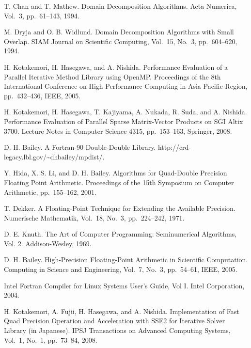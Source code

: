 \documentclass[a4paper]{jarticle}
\begin{document}
{\begin{thebibliography}{10}
T. Chan and T. Mathew.
\newblock Domain Decomposition Algorithms.
\newblock Acta Numerica, Vol.~3, pp.\ 61--143, 1994. 

M. Dryja and O. B. Widlund.
\newblock Domain Decomposition Algorithms with Small Overlap.
\newblock SIAM Journal on Scientific Computing, Vol.~15, No.~3, pp.\ 604--620, 1994.

H. Kotakemori, H. Hasegawa, and A. Nishida.
\newblock Performance Evaluation of a Parallel Iterative Method Library using OpenMP.
\newblock Proceedings of the 8th International Conference on High
	Performance Computing in Asia Pacific Region, pp.\ 432--436, IEEE, 2005.

H. Kotakemori, H. Hasegawa, T. Kajiyama, A. Nukada, R. Suda, and A. Nishida.
\newblock Performance Evaluation of Parallel Sparse Matrix-Vector Products on SGI Altix 3700.
\newblock Lecture Notes in Computer Science 4315, pp.\ 153--163, Springer, 2008.

D. H. Bailey.
\newblock A Fortran-90 Double-Double Library.
\newblock http://crd-legacy.lbl.gov/\textasciitilde dhbailey/mpdist/.

Y. Hida, X. S. Li, and D. H. Bailey.
\newblock Algorithms for Quad-Double Precision Floating Point Arithmetic.
\newblock Proceedings of the 15th Symposium on Computer Arithmetic, pp.\ 155--162, 2001.

T. Dekker.
\newblock A Floating-Point Technique for Extending the Available Precision.
\newblock Numerische Mathematik, Vol.~18, No.~3, pp.\ 224--242, 1971.

D. E. Knuth. 
The Art of Computer Programming: Seminumerical Algorithms, Vol. 2.
Addison-Wesley, 1969.

D. H. Bailey.
\newblock High-Precision Floating-Point Arithmetic in Scientific Computation.
\newblock Computing in Science and Engineering, Vol.~7, No.~3, pp.\ 54--61, IEEE, 2005.

\newblock Intel Fortran Compiler for Linux Systems User's Guide, Vol I.
\newblock Intel Corporation, 2004.

H. Kotakemori, A. Fujii, H. Hasegawa, and A. Nishida.
\newblock Implementation of Fast Quad Precision Operation and
	Acceleration with SSE2 for Iterative Solver Library (in
	Japanese).
\newblock IPSJ Transactions on Advanced Computing Systems,  Vol.~1, No.~1, pp.\ 73--84, 2008.


\end{thebibliography}}
\end{document}
